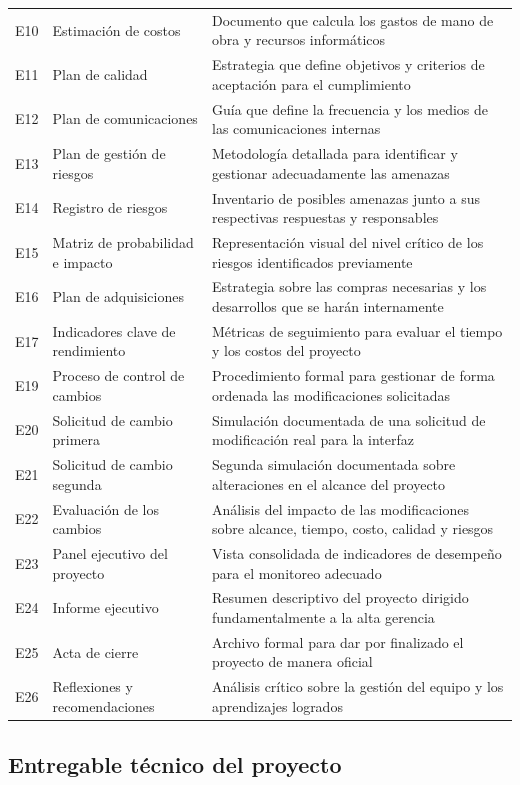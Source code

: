 \documentclass[11pt,spanish]{article}
\begin{document}
\begin{longtable}{L{1.5cm} L{5.8cm} L{7.1cm}}
E10 & Estimación de costos & Documento que calcula los gastos de mano de obra y recursos informáticos \\
E11 & Plan de calidad & Estrategia que define objetivos y criterios de aceptación para el cumplimiento \\
E12 & Plan de comunicaciones & Guía que define la frecuencia y los medios de las comunicaciones internas \\
E13 & Plan de gestión de riesgos & Metodología detallada para identificar y gestionar adecuadamente las amenazas \\
E14 & Registro de riesgos & Inventario de posibles amenazas junto a sus respectivas respuestas y responsables \\
E15 & Matriz de probabilidad e impacto & Representación visual del nivel crítico de los riesgos identificados previamente \\
E16 & Plan de adquisiciones & Estrategia sobre las compras necesarias y los desarrollos que se harán internamente \\
E17 & Indicadores clave de rendimiento & Métricas de seguimiento para evaluar el tiempo y los costos del proyecto \\
E19 & Proceso de control de cambios & Procedimiento formal para gestionar de forma ordenada las modificaciones solicitadas \\
E20 & Solicitud de cambio primera & Simulación documentada de una solicitud de modificación real para la interfaz \\
E21 & Solicitud de cambio segunda & Segunda simulación documentada sobre alteraciones en el alcance del proyecto \\
E22 & Evaluación de los cambios & Análisis del impacto de las modificaciones sobre alcance, tiempo, costo, calidad y riesgos \\
E23 & Panel ejecutivo del proyecto & Vista consolidada de indicadores de desempeño para el monitoreo adecuado \\
E24 & Informe ejecutivo & Resumen descriptivo del proyecto dirigido fundamentalmente a la alta gerencia \\
E25 & Acta de cierre & Archivo formal para dar por finalizado el proyecto de manera oficial \\
E26 & Reflexiones y recomendaciones & Análisis crítico sobre la gestión del equipo y los aprendizajes logrados \\
\bottomrule
\end{longtable}

\subsection{Entregable técnico del proyecto}
\end{document}
